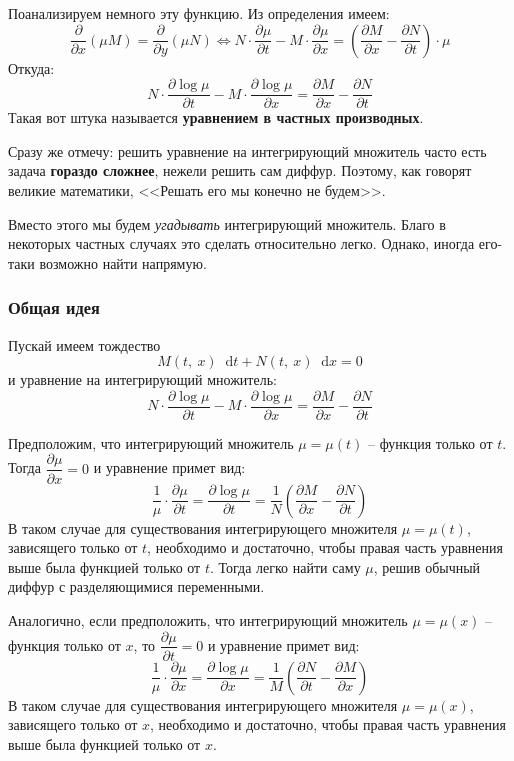 \documentclass[a4paper,12pt]{article}
\renewcommand*\d{\mathop{}\!\mathrm{d}}
\begin{document}
Поанализируем немного эту функцию. Из определения имеем:
\[\dfrac{\partial}{\partial x}(\mu M) = \dfrac{\partial}{\partial y}(\mu N) \iff N\cdot\dfrac{\partial \mu}{\partial t} - M \cdot \dfrac{\partial \mu}{\partial x} = \left(\dfrac{\partial M}{\partial x} - \dfrac{\partial N}{\partial t}\right)\cdot \mu\]
Откуда:
\[N\cdot\dfrac{\partial \log\mu}{\partial t} - M \cdot \dfrac{\partial \log\mu}{\partial x} = \dfrac{\partial M}{\partial x} - \dfrac{\partial N}{\partial t}\]
Такая вот штука называется \textbf{уравнением в частных производных}. 

Сразу же отмечу: решить уравнение на интегрирующий множитель часто есть задача \textbf{гораздо сложнее}, нежели решить сам диффур. Поэтому, как говорят великие математики, <<Решать его мы конечно не будем>>. 

Вместо этого мы будем \textit{угадывать} интегрирующий множитель. Благо в некоторых частных случаях это сделать относительно легко. Однако, иногда его-таки возможно найти напрямую.	

\subsubsection{Общая идея}

Пускай имеем тождество
\[M(t,\ x)\d t + N(t,\ x)\d x = 0\] и уравнение на интегрирующий множитель:
\[N\cdot\dfrac{\partial \log\mu}{\partial t} - M \cdot \dfrac{\partial \log\mu}{\partial x} = \dfrac{\partial M}{\partial x} - \dfrac{\partial N}{\partial t}\]

Предположим, что интегрирующий множитель $\mu = \mu(t)$ -- функция только от $t$. Тогда $\dfrac{\partial \mu}{\partial x} = 0$ и уравнение примет вид:
\[\dfrac{1}{\mu} \cdot \dfrac{\partial \mu}{\partial t} = \dfrac{\partial \log\mu}{\partial t} = \dfrac{1}{N}\left(\dfrac{\partial M}{\partial x} - \dfrac{\partial N}{\partial t}\right)\]
В таком случае для существования интегрирующего множителя $\mu = \mu(t)$, зависящего только от $t$, необходимо и достаточно, чтобы правая часть уравнения выше была функцией только от $t$. Тогда легко найти саму $\mu$, решив обычный диффур с разделяющимися переменными.

Аналогично, если предположить, что интегрирующий множитель $\mu = \mu(x)$ -- функция только от $x$, то  $\dfrac{\partial \mu}{\partial t} = 0$ и уравнение примет вид:
\[\dfrac{1}{\mu} \cdot \dfrac{\partial \mu}{\partial x} = \dfrac{\partial \log\mu}{\partial x} = \dfrac{1}{M}\left(\dfrac{\partial N}{\partial t} - \dfrac{\partial M}{\partial x}\right)\]
В таком случае для существования интегрирующего множителя $\mu = \mu(x)$, зависящего только от $x$, необходимо и достаточно, чтобы правая часть уравнения выше была функцией только от $x$.
\end{document}
